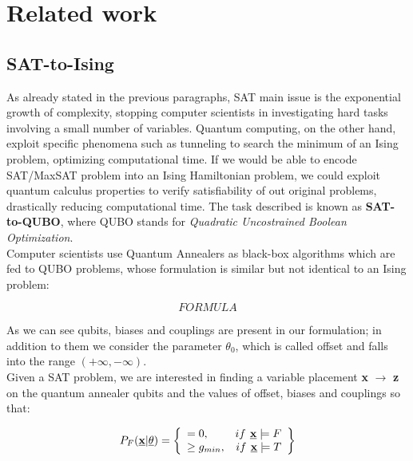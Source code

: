 \chapter{Related work}
\label{cha:related}

\section{SAT-to-Ising}
\label{sec:SATtoQUBO}

As already stated in the previous paragraphs, SAT main issue is the exponential growth of complexity, stopping computer scientists in investigating hard tasks involving a small number of variables. Quantum computing, on the other hand, exploit specific phenomena such as tunneling to search the minimum of an Ising problem, optimizing computational time. If we would be able to encode SAT/MaxSAT problem into an Ising Hamiltonian problem, we could exploit quantum calculus properties to verify satisfiability of out original problems, drastically reducing computational time. The task described is known as \textbf{SAT-to-QUBO}, where QUBO stands for \textit{Quadratic Uncostrained Boolean Optimization}. \\
Computer scientists use Quantum Annealers as black-box algorithms which are fed to QUBO problems, whose formulation is similar but not identical to an Ising problem:

\begin{equation}
    FORMULA
\end{equation}

As we can see qubits, biases and couplings are present in our formulation; in addition to them we consider the parameter $\theta_0$, which is called offset and falls into the range $(+\infty, -\infty)$. \\
Given a SAT problem, we are interested in finding a variable placement \textbf{x} $\rightarrow$ \textbf{z} on the quantum annealer qubits and the values of offset, biases and couplings so that:

\begin{equation}
    P_F(\underline{\textbf{x}} | \underline{\theta}) = 
    \left\{
        \begin{array}{lr}
            = 0, & if \textbf{ \underline{x}} \models F \\
            \geq g_{min}, & if \textbf{ \underline{x}} \models T
        \end{array}
    \right\}
\end{equation}

